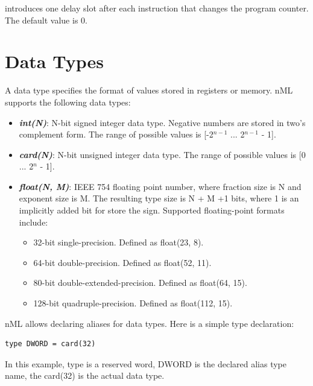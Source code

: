 \documentclass[oneside,final,14pt]{extreport}
\begin{document}
introduces one delay slot after each instruction that changes the program counter. The default
value is 0.


\section{Data Types}

A data type specifies the format of values stored in registers or memory. nML supports
the following data types:

\begin{itemize}

\item \textbf{\textit{int(N)}}:
N-bit signed integer data type. Negative numbers are stored in two's complement
form. The range of possible values is [-2$^{n-1}$ ... 2$^{n-1}$ - 1].

\item \textbf{\textit{card(N)}}:
N-bit unsigned integer data type. The range of possible values is [0 ... 2$^n$ - 1].

\item \textbf{\textit{float(N, M)}}: IEEE 754 floating point number, where fraction size is N and exponent size is M.
The resulting type size is N + M +1 bits, where 1 is an implicitly added bit for store the sign.
Supported floating-point formats include:

\begin{itemize}
\item 32-bit single-precision. Defined as float(23, 8).
\item 64-bit double-precision. Defined as float(52, 11).
\item 80-bit double-extended-precision. Defined as float(64, 15).
\item 128-bit quadruple-precision. Defined as float(112, 15).
\end{itemize}

\end{itemize}

nML allows declaring aliases for data types. Here is a simple type declaration:

\begin{lstlisting}
type DWORD = card(32)
\end{lstlisting}

In this example, type is a reserved word, DWORD is the declared alias type name,
the card(32) is the actual data type.
\end{document}
